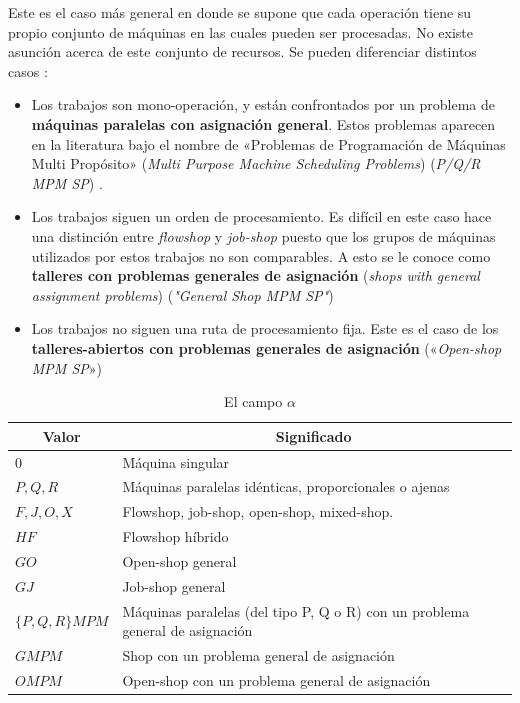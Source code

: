 \documentclass[spanish,draft,12pt,headsepline,footsepline,paper=letter]{scrreprt}
\begin{document}
Este es el caso más general en donde se supone que cada operación tiene su propio conjunto de máquinas en las cuales pueden ser procesadas. No existe asunción acerca de este conjunto de recursos. Se pueden diferenciar distintos casos \citep[p.~9]{TKindt2002}:

\begin{itemize}
\item Los trabajos son mono-operación, y están confrontados por un problema de \textbf{máquinas paralelas con asignación general}. Estos problemas aparecen en la literatura bajo el nombre de «Problemas de Programación de Máquinas Multi Propósito» (\textit{Multi Purpose Machine Scheduling Problems}) (\textit{P/Q/R MPM SP}) \citep[p.~9]{TKindt2002}.

\item Los trabajos siguen un orden de procesamiento. Es difícil en este caso hace una distinción entre \textit{flowshop} y \textit{job-shop} puesto que los grupos de máquinas utilizados por estos trabajos no son comparables. A esto se le conoce como \textbf{talleres con problemas generales de asignación} (\textit{shops with general assignment problems}) (\textit{"General Shop MPM SP"})

\item Los trabajos no siguen una ruta de procesamiento fija. Este es el caso de los \textbf{talleres-abiertos con problemas generales de asignación} («\textit{Open-shop MPM SP}»)

\end{itemize}

\begin{table}
\centering
\begin{tabular}{l p{12cm}}
\toprule
  \multicolumn{1}{c}{Valor} & \multicolumn{1}{c}{Significado} \\
  \midrule
  $0$ & Máquina singular \\
  $P,Q,R$ & Máquinas paralelas idénticas, proporcionales o ajenas \\
  $F,J,O,X$ & Flowshop, job-shop, open-shop, mixed-shop. \\
  $HF$ & Flowshop híbrido \\
  $GO$ & Open-shop general \\
  $GJ$ & Job-shop general \\
  $\{P,Q,R\}MPM$ & Máquinas paralelas (del tipo P, Q o R) con un problema general de asignación \\
  $G M P M$ & Shop con un problema general de asignación \\
  $O M P M$ & Open-shop con un problema general de asignación \\
  \bottomrule
\end{tabular}
  \caption{El campo $\alpha$}
  \label{tab:notation_alpha}
\end{table}
\end{document}
